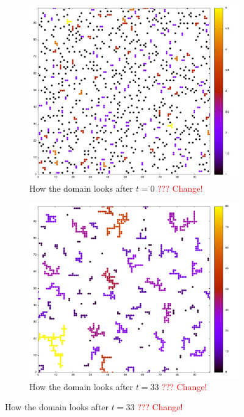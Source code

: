 \begin{figure}[h]
	\begin{center}
		\begin{subfigure}[t]{0.45\textwidth}
			\includegraphics[width = \textwidth]{fig/000_on.png}
			\caption{How the domain looks after $ t = 0 $ \textcolor{red}{??? Change!}}
			\label{fig:0}
		\end{subfigure}
		\begin{subfigure}[t]{0.45\textwidth}
			\includegraphics[width = \textwidth]{fig/0033_on.png}
			\caption{How the domain looks after $ t = 33 $ \textcolor{red}{??? Change!} }

\end{subfigure}
\end{center}
\end{figure}
